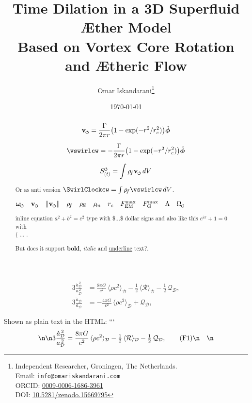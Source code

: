 \documentclass{article}
\title{Time Dilation in a 3D Superfluid Æther Model\\  Based on Vortex Core Rotation and Ætheric Flow }
\author{
    Omar Iskandarani\thanks{
        Independent Researcher, Groningen, The Netherlands.\\
        Email: \texttt{info@omariskandarani.com}\\
        ORCID: \href{https://orcid.org/0009-0006-1686-3961}{0009-0006-1686-3961}\\
        DOI: \href{https://doi.org/10.5281/zenodo.15669902}{10.5281/zenodo.15669795}
    }
}
\date{\today}
\newcommand{\vswirl}{\mathbf{v}_{\mkern-2mu\scriptscriptstyle\boldsymbol{\circlearrowleft}}}
\newcommand{\SwirlClock}{S_{(t)}^{\mkern-2mu\scriptscriptstyle\boldsymbol{\circlearrowleft}}}
\newcommand{\omegas}{\boldsymbol{\omega}_{\mkern-2mu\scriptscriptstyle\boldsymbol{\circlearrowleft}}}  %
\newcommand{\vscore}{\mathbf{v}_{\mkern-2mu\scriptscriptstyle\boldsymbol{\circlearrowleft}}}                    %
\newcommand{\vnorm}{\lVert \vswirl \rVert}               %
\newcommand{\rhof}{\rho_{\!f}}                           %
\newcommand{\rhoE}{\rho_{\!E}}                           %
\newcommand{\rhom}{\rho_{\!m}}                           %
\newcommand{\rc}{r_c}                                    %
\newcommand{\FmaxEM}{F_{\mathrm{EM}}^{\max}}             %
\newcommand{\FmaxG}{F_{\mathrm{G}}^{\max}}               %
\newcommand{\Lam}{\Lambda}                               %
\newcommand{\Om}{\Omega_{\mkern-2mu\scriptscriptstyle\boldsymbol{\circlearrowleft}}}                   %
\begin{document}
    \maketitle

    \begin{abstract}

        \begin{equation}
            \vswirl = \frac{\Gamma}{2\pi r}\bigl(1-\exp(-r^2/\rc^2)\bigr)\hat{\bm{\phi}}
        \end{equation}

        \[\vswirlcw = -\frac{\Gamma}{2\pi r}\bigl(1-\exp(-r^2/\rc^2)\bigr)\hat{\bm{\phi}}\]


        \begin{equation}
            \SwirlClock = \int \rhof \vswirl \, dV
        \end{equation}

        Or as anti version \(\SwirlClockcw = \int \rhof \vswirlcw \, dV\).

        $\omegas\quad \vscore\quad \vnorm\quad \rhof\quad \rhoE\quad \rhom\quad \rc\quad \FmaxEM\quad \FmaxG\quad \Lam\quad \Om$

        inline equation $a^2 + b^2 = c^2$ type with \$...\$ dollar signs
        and also like this \(e^{i\pi} + 1 = 0\) with \\( ... \).

        But does it support \textbf{bold}, \textit{italic} and \underline{underline} text?.

    \end{abstract}

    \begin{align}
        3\frac{\dot a_\mathcal{D}^{\,2}}{a_\mathcal{D}^{\,2}}
        &= \frac{8\pi G}{c^2}\,\langle \rho c^2 \rangle_\mathcal{D}
        - \tfrac{1}{2}\,\langle \mathcal{R} \rangle_\mathcal{D}
        - \tfrac{1}{2}\,\mathcal{Q}_\mathcal{D}, \tag{F1}\label{F1}\\
        3\frac{\ddot a_\mathcal{D}}{a_\mathcal{D}}
        &= -\frac{4\pi G}{c^2}\,\langle \rho c^2 \rangle_\mathcal{D}
        + \mathcal{Q}_\mathcal{D}, \tag{F2}\label{F2}
    \end{align}


    Shown as plain text in the HTML:
```
\[\n\begin{aligned}\n3\frac{\dot a_\mathcal{D}^{\,2}}{a_\mathcal{D}^{\,2}} &= \frac{8\pi G}{c^2}\,\langle \rho c^2 \rangle_\mathcal{D} - \tfrac{1}{2}\,\langle \mathcal{R} \rangle_\mathcal{D} - \tfrac{1}{2}\,\mathcal{Q}_\mathcal{D}, \tag{F1}\n\end{aligned}\n\]
\end{document}

